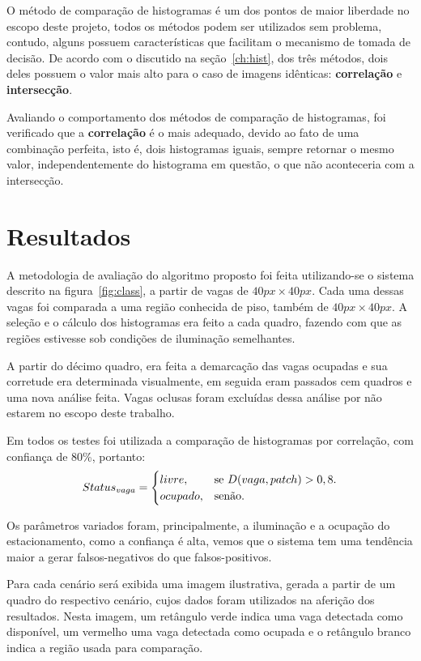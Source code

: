 \documentclass[ecp,tc]{iiufrgs}
\begin{document}
O método de comparação de histogramas é um dos pontos de maior liberdade no escopo deste projeto, todos os métodos podem ser utilizados sem problema, contudo, alguns possuem características que facilitam o mecanismo de tomada de decisão. De acordo com o discutido na seção~\ref{ch:hist}, dos três métodos, dois deles possuem o valor mais alto para o caso de imagens idênticas: \textbf{correlação} e \textbf{intersecção}.

Avaliando o comportamento dos métodos de comparação de histogramas, foi verificado que a \textbf{correlação} é o mais adequado, devido ao fato de uma combinação perfeita, isto é, dois histogramas iguais, sempre retornar o mesmo valor, independentemente do histograma em questão, o que não aconteceria com a intersecção.

\chapter{Resultados}

A metodologia de avaliação do algoritmo proposto foi feita utilizando-se o sistema descrito na figura~\ref{fig:class}, a partir de vagas de $ 40px \times 40px $. Cada uma dessas vagas foi comparada a uma região conhecida de piso, também de $ 40px \times 40px $. A seleção e o cálculo dos histogramas era feito a cada quadro, fazendo com que as regiões estivesse sob condições de iluminação semelhantes.

A partir do décimo quadro, era feita a demarcação das vagas ocupadas e sua corretude era determinada visualmente, em seguida eram passados cem quadros e uma nova análise feita. Vagas oclusas foram excluídas dessa análise por não estarem no escopo deste trabalho.

Em todos os testes foi utilizada a comparação de histogramas por correlação, com confiança de 80\%, portanto:
\begin{equation}
Status_{vaga}=\begin{cases}
livre, & \text{se $ D(vaga,patch) > 0,8 $}.\\
ocupado, & \text{senão}.
\end{cases}
\end{equation}

Os parâmetros variados foram, principalmente, a iluminação e a ocupação do estacionamento, como a confiança é alta, vemos que o sistema tem uma tendência maior a gerar falsos-negativos do que falsos-positivos.

Para cada cenário será exibida uma imagem ilustrativa, gerada a partir de um quadro do respectivo cenário, cujos dados foram utilizados na aferição dos resultados. Nesta imagem, um retângulo verde indica uma vaga detectada como disponível, um vermelho uma vaga detectada como ocupada e o retângulo branco indica a região usada para comparação.
\end{document}
